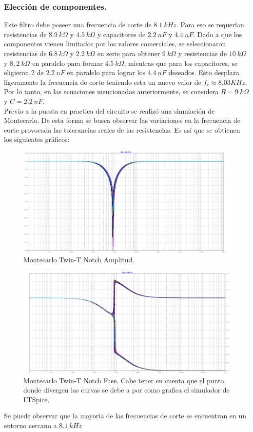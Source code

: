 \documentclass[a4paper]{article}
\begin{document}
\subsubsection{Elección de componentes.}
 Este filtro debe poseer una frecuencia de corte de $ 8.1 \ kHz $. Para eso se requerían resistencias de $ 8.9 \ k\Omega $ y $ 4.5 \ k\Omega $ y capacitores de $ 2.2 \ nF $ y $ 4.4 \ nF $.
Dado a que los componentes vienen limitados por los valores comerciales,  se seleccionaron resistencias de $ 6.8 \ k\Omega $ y $ 2.2 \ k\Omega $ en serie para obtener  $ 9 \ k\Omega $ y  resistencias de $ 10 \ k\Omega $ y $ 8,2 \ k\Omega $ en paralelo para formar $ 4.5 \ k\Omega $, mientras que para los capacitores, se eligieron 2 de $ 2.2 \ nF $ en paralelo para lograr los $ 4.4 \ nF $ deseados. Esto desplaza ligeramente la frecuencia de corte teniendo esta un nuevo valor de $f_c \approx 8.03 KHz$. Por lo tanto, en las ecuaciones mencionadas anteriormente, se considera $ R = 9 \ k\Omega $ y $ C = 2.2 \ nF $.\\
Previo a la puesta en practica del circuito se realizó una simulación de Montecarlo. De esta forma se busca observar las variaciones en la frecuencia de corte provocada las tolerancias reales de las resistencias. Es así que se obtienen los siguientes gráficos:
\begin{figure}[H]
	\centering
	\includegraphics[width=\textwidth ]{Montecarlo.PNG}
\caption{Montecarlo Twin-T Notch Amplitud.}
	\label{fig:Montecarlo}
\end{figure}
\begin{figure}[H]
	\centering
	\includegraphics[width=\textwidth]{MontecarloPh.PNG}
\caption{Montecarlo Twin-T Notch Fase. Cabe tener en cuenta que el punto donde divergen las curvas se debe a por como grafica el simulador de LTSpice.}
	\label{fig:MontecarloFase}
\end{figure}
Se puede observar que la mayoria de las frecuencias de corte se encuentran en un entorno cercano a $8.1 \ kHz$
\end{document}
